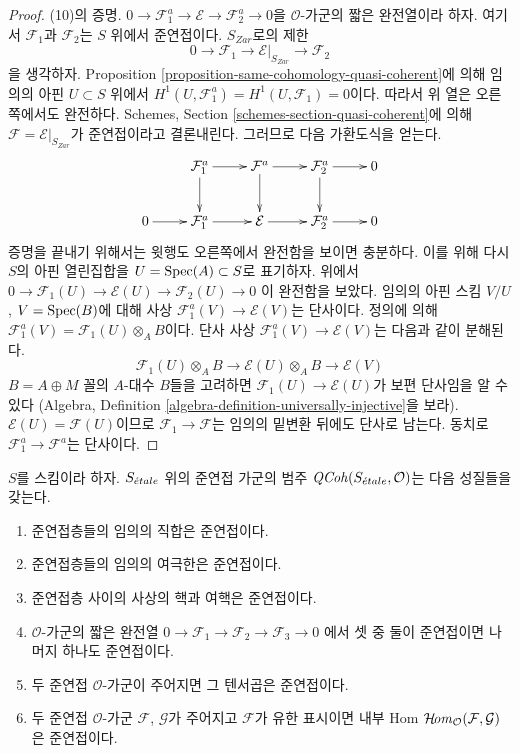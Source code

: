 \begin{proof}
\medskip\noindent
(10)의 증명.
$0 \to \mathcal{F}_1^a \to \mathcal{E} \to \mathcal{F}_2^a \to 0$을
$\mathcal{O}$-가군의 짧은 완전열이라 하자. 여기서 $\mathcal{F}_1$과
$\mathcal{F}_2$는 $S$ 위에서 준연접이다. $S_{Zar}$로의 제한
$$
0 \to \mathcal{F}_1 \to \mathcal{E}|_{S_{Zar}} \to \mathcal{F}_2
$$
을 생각하자. Proposition
\ref{proposition-same-cohomology-quasi-coherent}에 의해 임의의 아핀
$U \subset S$ 위에서
$H^1(U, \mathcal{F}_1^a) = H^1(U, \mathcal{F}_1) = 0$이다.
따라서 위 열은 오른쪽에서도 완전하다. Schemes, Section
\ref{schemes-section-quasi-coherent}에 의해
$\mathcal{F} = \mathcal{E}|_{S_{Zar}}$가 준연접이라고 결론내린다.
그러므로 다음 가환도식을 얻는다.
$$
\xymatrix{
& \mathcal{F}_1^a \ar[r] \ar[d] &
\mathcal{F}^a \ar[r] \ar[d] &
\mathcal{F}_2^a \ar[r] \ar[d] & 0 \\
0 \ar[r] &
\mathcal{F}_1^a \ar[r] &
\mathcal{E} \ar[r] &
\mathcal{F}_2^a \ar[r] & 0
}
$$
증명을 끝내기 위해서는 윗행도 오른쪽에서 완전함을 보이면 충분하다.
이를 위해 다시 $S$의 아핀 열린집합을 $U = \mathop{\mathrm{Spec}}(A) \subset S$로
표기하자. 위에서
$0 \to \mathcal{F}_1(U) \to \mathcal{E}(U) \to \mathcal{F}_2(U) \to 0$
이 완전함을 보았다. 임의의 아핀 스킴 $V/U$, $V = \mathop{\mathrm{Spec}}(B)$에 대해
사상 $\mathcal{F}_1^a(V) \to \mathcal{E}(V)$는 단사이다. 정의에 의해
$\mathcal{F}_1^a(V) = \mathcal{F}_1(U) \otimes_A B$이다. 단사 사상
$\mathcal{F}_1^a(V) \to \mathcal{E}(V)$는 다음과 같이 분해된다.
$$
\mathcal{F}_1(U) \otimes_A B \to
\mathcal{E}(U) \otimes_A B \to \mathcal{E}(V)
$$
$B = A \oplus M$ 꼴의 $A$-대수 $B$들을 고려하면
$\mathcal{F}_1(U) \to \mathcal{E}(U)$가 보편 단사임을 알 수 있다
(Algebra, Definition \ref{algebra-definition-universally-injective}을 보라).
$\mathcal{E}(U) = \mathcal{F}(U)$이므로
$\mathcal{F}_1 \to \mathcal{F}$는 임의의 밑변환 뒤에도 단사로 남는다.
동치로 $\mathcal{F}_1^a \to \mathcal{F}^a$는 단사이다.
\end{proof}

\begin{lemma}
\label{lemma-properties-quasi-coherent}
$S$를 스킴이라 하자. $S_{\acute{e}tale}$ 위의 준연접 가군의 범주
$\mathit{QCoh}(S_{\acute{e}tale}, \mathcal{O})$는 다음 성질들을 갖는다.
\begin{enumerate}
\item 준연접층들의 임의의 직합은 준연접이다.
\item 준연접층들의 임의의 여극한은 준연접이다.
\item 준연접층 사이의 사상의 핵과 여핵은 준연접이다.
\item $\mathcal{O}$-가군의 짧은 완전열
$0 \to \mathcal{F}_1 \to \mathcal{F}_2 \to \mathcal{F}_3 \to 0$
에서 셋 중 둘이 준연접이면 나머지 하나도 준연접이다.
\item 두 준연접 $\mathcal{O}$-가군이 주어지면 그 텐서곱은 준연접이다.
\item 두 준연접 $\mathcal{O}$-가군 $\mathcal{F}$, $\mathcal{G}$가
주어지고 $\mathcal{F}$가 유한 표시이면 내부 Hom
$\mathop{\mathcal{H}\!\mathit{om}}\nolimits_\mathcal{O}(\mathcal{F}, \mathcal{G})$
은 준연접이다.
\end{enumerate}
\end{lemma}

